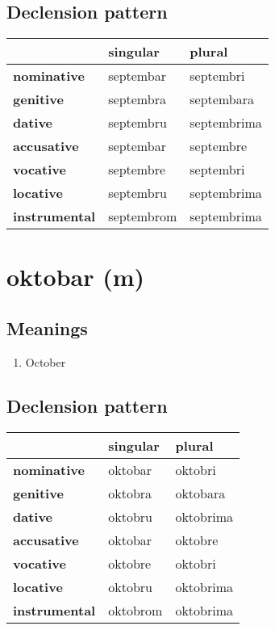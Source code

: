 \subsection*{Declension pattern}
\begin{tabularx}{\linewidth}{Xll}
\toprule
{} &    singular &       plural \\
\midrule
\textbf{nominative  } &   septembar &    septembri \\
\textbf{genitive    } &   septembra &   septembara \\
\textbf{dative      } &   septembru &  septembrima \\
\textbf{accusative  } &   septembar &    septembre \\
\textbf{vocative    } &   septembre &    septembri \\
\textbf{locative    } &   septembru &  septembrima \\
\textbf{instrumental} &  septembrom &  septembrima \\
\bottomrule
\end{tabularx}

\filbreak
\section{oktobar (m)}
\subsection*{Meanings}
\begin{enumerate}
\item October
\end{enumerate}
\subsection*{Declension pattern}
\begin{tabularx}{\linewidth}{Xll}
\toprule
{} &  singular &     plural \\
\midrule
\textbf{nominative  } &   oktobar &    oktobri \\
\textbf{genitive    } &   oktobra &   oktobara \\
\textbf{dative      } &   oktobru &  oktobrima \\
\textbf{accusative  } &   oktobar &    oktobre \\
\textbf{vocative    } &   oktobre &    oktobri \\
\textbf{locative    } &   oktobru &  oktobrima \\
\textbf{instrumental} &  oktobrom &  oktobrima \\
\bottomrule
\end{tabularx}

